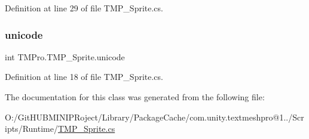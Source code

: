 Definition at line 29 of file T\+M\+P\+\_\+\+Sprite.\+cs.

\mbox{\label{class_t_m_pro_1_1_t_m_p___sprite_ae3dfeb6d8025927bc22bb5aa9a71df4e}} 
\subsubsection{\texorpdfstring{unicode}{unicode}}
{\footnotesize\ttfamily int T\+M\+Pro.\+T\+M\+P\+\_\+\+Sprite.\+unicode}



Definition at line 18 of file T\+M\+P\+\_\+\+Sprite.\+cs.



The documentation for this class was generated from the following file\+:\begin{DoxyCompactItemize}
\item 
O\+:/\+Git\+H\+U\+B\+M\+I\+N\+I\+P\+Roject/\+Library/\+Package\+Cache/com.\+unity.\+textmeshpro@1../\+Scripts/\+Runtime/\mbox{\hyperlink{_t_m_p___sprite_8cs}{T\+M\+P\+\_\+\+Sprite.\+cs}}\end{DoxyCompactItemize}
